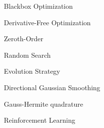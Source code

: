 \begin{abbreviations}
	\item[BO] Blackbox Optimization 
	\item[DFO] Derivative-Free Optimization
	\item[ZO] Zeroth-Order 
	\item[RS] Random Search
	\item[ES] Evolution Strategy
	\item[DGS] Directional Gaussian Smoothing
	\item[GH] Gauss-Hermite quadrature
	\item[RL] Reinforcement Learning 
\end{abbreviations}

